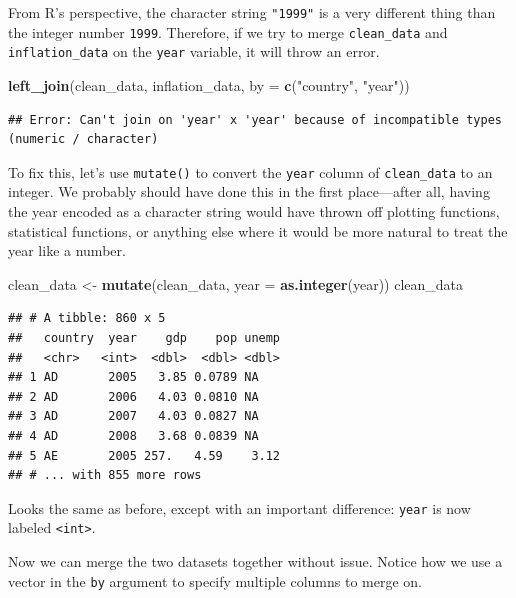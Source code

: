 \documentclass[
  12pt,
  oneside,openany]{book}
\newenvironment{Shaded}{\begin{snugshade}}{\end{snugshade}}
\newcommand{\DataTypeTok}[1]{\textcolor[rgb]{0.13,0.29,0.53}{#1}}
\newcommand{\KeywordTok}[1]{\textcolor[rgb]{0.13,0.29,0.53}{\textbf{#1}}}
\newcommand{\NormalTok}[1]{#1}
\newcommand{\StringTok}[1]{\textcolor[rgb]{0.31,0.60,0.02}{#1}}
\begin{document}
From R's perspective, the character string \texttt{"1999"} is a very different thing than the integer number \texttt{1999}. Therefore, if we try to merge \texttt{clean\_data} and \texttt{inflation\_data} on the \texttt{year} variable, it will throw an error.

\begin{Shaded}
\begin{Highlighting}[]
\KeywordTok{left\_join}\NormalTok{(clean\_data,}
\NormalTok{          inflation\_data,}
          \DataTypeTok{by =} \KeywordTok{c}\NormalTok{(}\StringTok{"country"}\NormalTok{, }\StringTok{"year"}\NormalTok{))}
\end{Highlighting}
\end{Shaded}

\begin{verbatim}
## Error: Can't join on 'year' x 'year' because of incompatible types (numeric / character)
\end{verbatim}

To fix this, let's use \texttt{mutate()} to convert the \texttt{year} column of \texttt{clean\_data} to an integer. We probably should have done this in the first place---after all, having the year encoded as a character string would have thrown off plotting functions, statistical functions, or anything else where it would be more natural to treat the year like a number.

\begin{Shaded}
\begin{Highlighting}[]
\NormalTok{clean\_data <{-}}\StringTok{ }\KeywordTok{mutate}\NormalTok{(clean\_data,}
                     \DataTypeTok{year =} \KeywordTok{as.integer}\NormalTok{(year))}
\NormalTok{clean\_data}
\end{Highlighting}
\end{Shaded}

\begin{verbatim}
## # A tibble: 860 x 5
##   country  year    gdp    pop unemp
##   <chr>   <int>  <dbl>  <dbl> <dbl>
## 1 AD       2005   3.85 0.0789 NA   
## 2 AD       2006   4.03 0.0810 NA   
## 3 AD       2007   4.03 0.0827 NA   
## 4 AD       2008   3.68 0.0839 NA   
## 5 AE       2005 257.   4.59    3.12
## # ... with 855 more rows
\end{verbatim}

Looks the same as before, except with an important difference: \texttt{year} is now labeled \texttt{\textless{}int\textgreater{}}.

Now we can merge the two datasets together without issue. Notice how we use a vector in the \texttt{by} argument to specify multiple columns to merge on.
\end{document}
